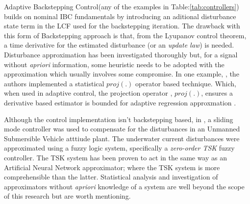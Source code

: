 \par
Adaptive Backstepping Control\cite{backstepping}(any of the examples in Table:\ref{tab:controllers}) builds on nominal IBC fundamentals by introducing an aditional disturbance state term in the LCF used for the backstepping iteration. The drawback with this form of Backstepping approach is that, from the Lyupanov control theorem, a time derivative for the estimated disturbance (or an \emph{update law}) is needed. Disturbance approximation has been investigated thoroughly but, for a signal without \emph{apriori} information, some heuristic needs to be adopted with the approximation which usually involves some compromise. In one example, \cite{nonlinearadaptive}, the authors implemented a statistical $proj(.)$ operator based technique. Which, when used in adaptive control, the projection operator \cite{outputfeedback}, $proj(.)$, ensures a derivative based estimator is bounded for adaptive regression approxmation \cite{nonlinearregression}.
\par
Although the control implementation isn't backstepping based, in \cite{adaptiveslidingmode}, a sliding mode controller was used to compensate for the disturbances in an Unmanned Submersible Vehicle atttiude plant. The underwater current disturbances were approximated using a fuzzy logic system, specifically a \emph{zero-order TSK} fuzzy controller. The TSK system has been proven to act in the same way as an Artificial Neural Network approximator\cite{zeroTSK}; where the TSK system is more comprehensible than the latter. Statistical analysis and investigation of approximators without \emph{apriori} knowledge of a system are well beyond the scope of this research
 but are worth mentioning.
